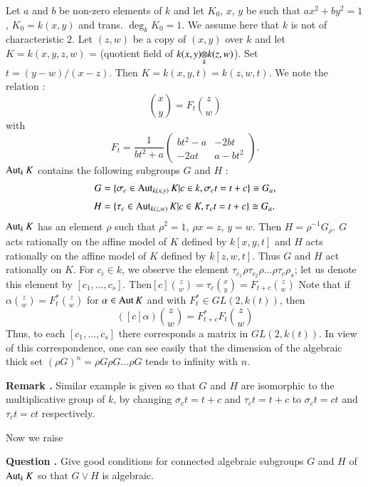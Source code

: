 \begin{example*}
Let $a$ and $b$ be non-zero elements of $k$ and let $K_{0}$, $x$, $y$ be such that $ax^{2}+by^{2}=1$, $K_{0}=k(x,y)$ and trans. $\deg_{k}K_{0}=1$. We assume here that $k$ is not of characteristic $2$. Let $(z,w)$ be a copy of $(x,y)$ over $k$ and let $K=k(x,y,z,w)$ = (quotient field of $\foprod{k(x,y)}{k(z,w)}{k}$). Set $t=(y-w)/(x-z)$. Then $K=k(x,y,t)=k(z,w,t)$. We note the relation :
$$
\binom{x}{y}=F_{t}\binom{z}{w}
$$
with
$$
F_{t}=\frac{1}{bt^{2}+a}\left(\begin{matrix} bt^{2}-a & -2bt\\ -2at & a-bt^{2}\end{matrix}\right).
$$
$\operatorname{\mathrm{Aut}}_{k}K$ contains the following subgroups $G$ and $H$ :
\begin{align*}
G &= \{\sigma_{c}\in \operatorname{\mathrm{Aut}}_{k(x,y)}K | c\in k, \sigma_{c}t=t+c\}\cong G_{a},\\[3pt]
H &= \{\tau_{c}\in \operatorname{\mathrm{Aut}}_{k(z,w)}K | c\in K, \tau_{c}t=t+c\}\cong G_{a}.
\end{align*}
$\operatorname{\mathrm{Aut}}_{k}K$ has an element $\rho$ such that $\rho^{2}=1$, $\rho x=z$, $y=w$. Then $H=\rho^{-1}G_{\rho}$. $G$ acts rationally on the affine model of $K$ defined by $k[x,y,t]$ and $H$ acts rationally on the affine model of $K$ defined by $k[z,w,t]$. Thus $G$ and $H$ act rationally on $K$. For $c_{i}\in k$, we observe the element $\tau_{c_{1}}\rho \tau_{c_{2}}\rho\ldots\rho \tau_{c}\rho_{s}$; let us denote this element by $[c_{1},\ldots,c_{s}]$. Then\pageoriginale $[c]\binom{z}{w}=\tau_{c}\binom{x}{y}=F_{t+c}\binom{z}{w}$ Note that if $\alpha\binom{z}{w}=F^{*}_{t}\binom{z}{w}$ for $\alpha \in \operatorname{\mathrm{Aut}} K$ and with $F^{*}_{t}\in GL(2,k(t))$, then
$$
([c]\alpha)\binom{z}{w}=F^{*}_{t+c}F_{t}\binom{z}{w}
$$
Thus, to each $[c_{1},\ldots,c_{s}]$ there corresponds a matrix in $GL(2,k(t))$. In view of this correspondence, one can see easily that the dimension of the algebraic thick set $(\rho G)^{n}=\rho G\rho G\ldots \rho G$ tends to infinity with $n$.
\end{example*}

\medskip
\noindent
{\bf Remark .\label{art16-rem2.2}}
Similar example is given so that $G$ and $H$ are isomorphic to the multiplicative group of $k$, by changing $\sigma_{c}t=t+c$ and $\tau_{c}t=t+c$ to $\sigma_{c}t=ct$ and $\tau_{c}t=ct$ respectively.
\smallskip

Now we raise

\medskip
\noindent
{\bf Question .\label{art16-ques2.3}}
Give good conditions for connected algebraic subgroups $G$ and $H$ of $\operatorname{\mathrm{Aut}}_{k}K$ so that $G\vee H$ is algebraic.
\smallskip

